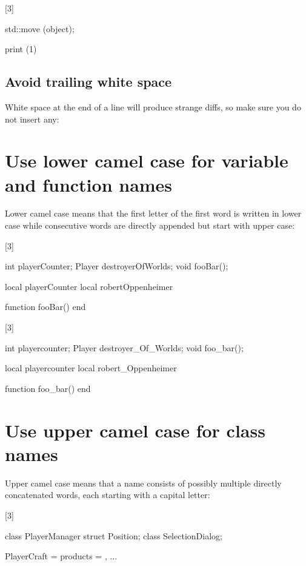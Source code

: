 \documentclass[a4paper,11pt]{scrreprt}
\newcommand{\marginMarker}[1]{%
\marginnote{%
    \hfill%
		\Huge{#1}%
}[3\baselineskip]%
}
\newcommand{\conforming}{%
\marginMarker{\textcolor{green}{\ding{51}}}%
}
\newcommand{\nonconforming}{%
\marginMarker{\textcolor{red}{\ding{55}}}%
}
\begin{document}
\nonconforming{}
\begin{cppBox}[showspaces]
std::move (object);
\end{cppBox}
\begin{luaBox}[showspaces]
print (1)
\end{luaBox}

\subsection{Avoid trailing white space}
White space at the end of a line will produce strange diffs, so make sure you do not insert any:

\section{Use lower camel case for variable and function names}
Lower camel case means that the first letter of the first word is written in lower case while consecutive words are directly appended but start with upper case:

\conforming{}
\begin{cppBox}
int playerCounter;
Player destroyerOfWorlds;
void fooBar();
\end{cppBox}
\begin{luaBox}
local playerCounter
local robertOppenheimer

function fooBar()
end
\end{luaBox}

\nonconforming{}
\begin{cppBox}
int playercounter;
Player destroyer_Of_Worlds;
void foo_bar();
\end{cppBox}
\begin{luaBox}
local playercounter
local robert_Oppenheimer

function foo_bar()
end
\end{luaBox}


\section{Use upper camel case for class names}
Upper camel case means that a name consists of possibly multiple directly concatenated words, each starting with a capital letter:

\conforming{}
\begin{cppBox}
class PlayerManager
struct Position;
class SelectionDialog;
\end{cppBox}
\begin{luaBox}[mathescape]
PlayerCraft = {
    products = {},
    $\dots$
}
\end{luaBox}
\end{document}
